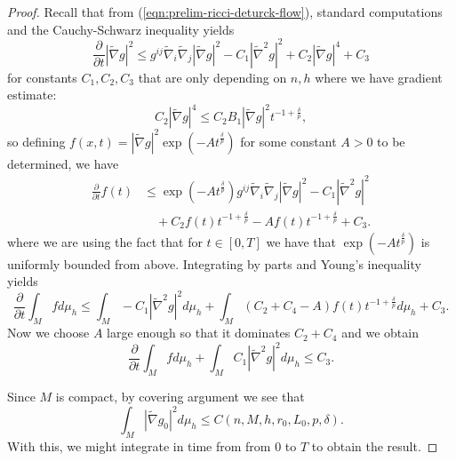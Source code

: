\documentclass[12pt]{amsart}
\theoremstyle{plain}
\theoremstyle{plain}
\theoremstyle{definition}
\theoremstyle{remark}
\numberwithin{equation}{subsection}
\newcommand{\hdel}{\tilde{\nabla}}
\begin{document}
\begin{proof}
    Recall that from (\ref{eqn:prelim-ricci-deturck-flow}), standard computations and the Cauchy-Schwarz inequality yields
    \begin{equation*}
        \frac{\partial}{\partial t} |\hdel g|^2 \leq g^{ij}\hdel_i\hdel_j |\hdel g|^2 - C_1 |\hdel^2 g|^2 + C_2|\hdel g|^4 + C_3
    \end{equation*}
    for constants $C_1, C_2, C_3$ that are only depending on $n, h$ where we have gradient estimate:
    \begin{equation*}
        C_2|\hdel g|^4 \leq C_2B_1|\hdel g|^2t^{-1+\frac{\delta}{p}},
    \end{equation*}
    so defining $f(x,t) = |\hdel g|^2\exp\left(-At^\frac{\delta}{p}\right)$ for some constant $A > 0$ to be determined, we have
    \begin{align*}
        \frac{\partial}{\partial t} f(t) &\leq \exp\left(-At^\frac{\delta}{p}\right)g^{ij}\hdel_i\hdel_j|\hdel g|^2 - C_1|\hdel^2 g|^2 \nonumber \\
        &\quad + C_2f(t)t^{-1+\frac{\delta}{p}} - Af(t)t^{-1+\frac{\delta}{p}} + C_3.
    \end{align*}
    where we are using the fact that for $t \in [0, T]$ we have that $\exp\left(-At^\frac{\delta}{p}\right)$ is uniformly bounded from above. Integrating by parts and Young's inequality yields
    \begin{equation*}
        \frac{\partial}{\partial t} \int_M fd\mu_h \leq \int_M -C_1|\hdel^2g|^2d\mu_h + \int_M\left(C_2+C_4-A\right)f(t)t^{-1+\frac{\delta}{p}}d\mu_h + C_3.
    \end{equation*}
    Now we choose $A$ large enough so that it dominates $C_2 + C_4$ and we obtain
    \begin{equation*}
        \frac{\partial}{\partial t} \int_M fd\mu_h + \int_M C_1|\hdel^2 g|^2d\mu_h \leq C_3.
    \end{equation*}
    
Since $M$ is compact, by covering argument we see that 
\begin{equation}
\int_M |\tilde\nabla g_0|^2 d\mu_h \leq C(n,M,h,r_0,L_0,p,\delta).
\end{equation} 
With this, we might integrate in time from from $0$ to $T$ to obtain the result.
\end{proof}
\end{document}
